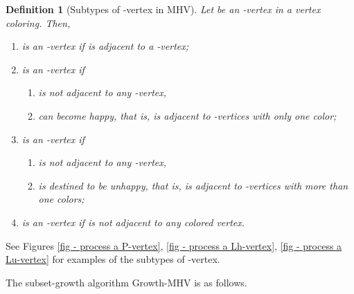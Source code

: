 \documentclass[11pt]{article}
\newtheorem{definition}{Definition}[section]
\begin{document}
\begin{definition}[Subtypes of -vertex in MHV]
Let  be an -vertex in a vertex coloring. Then,
\begin{enumerate}
\item  is an {\em -vertex} if  is adjacent to a -vertex;
\item  is an {\em -vertex} if
\begin{enumerate}
    \item  is not adjacent to any -vertex,
    \item  can become happy, that is,  is adjacent to -vertices with only
    one color;
\end{enumerate}
\item  is an {\em -vertex} if
\begin{enumerate}
    \item  is not adjacent to any -vertex,
    \item  is destined to be unhappy, that is,  is adjacent to -vertices
    with more than one colors;
\end{enumerate}
\item  is an {\em -vertex} if  is not adjacent to any colored vertex.
\end{enumerate}
\end{definition}

See Figures \ref{fig - process a P-vertex}, \ref{fig - process a Lh-vertex},
\ref{fig - process a Lu-vertex} for examples of the subtypes of -vertex.

The subset-growth algorithm {\sc Growth-MHV} is as follows.
\end{document}
